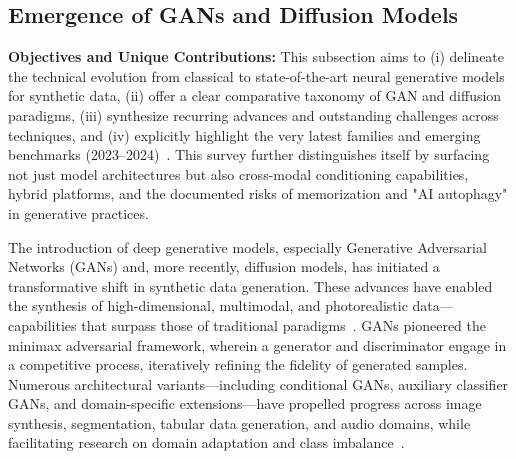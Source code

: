 \documentclass[sigconf]{acmart}
\begin{document}
\subsection{Emergence of GANs and Diffusion Models}

\textbf{Objectives and Unique Contributions:} This subsection aims to (i) delineate the technical evolution from classical to state-of-the-art neural generative models for synthetic data, (ii) offer a clear comparative taxonomy of GAN and diffusion paradigms, (iii) synthesize recurring advances and outstanding challenges across techniques, and (iv) explicitly highlight the very latest families and emerging benchmarks (2023--2024)~\cite{ref1,ref10,ref12,ref13,ref14,ref15,ref16,ref18,ref21,ref22,ref24,ref25,ref26,ref64,ref75,ref81,ref82,ref89,ref90}. This survey further distinguishes itself by surfacing not just model architectures but also cross-modal conditioning capabilities, hybrid platforms, and the documented risks of memorization and "AI autophagy" in generative practices.

The introduction of deep generative models, especially Generative Adversarial Networks (GANs) and, more recently, diffusion models, has initiated a transformative shift in synthetic data generation. These advances have enabled the synthesis of high-dimensional, multimodal, and photorealistic data---capabilities that surpass those of traditional paradigms~\cite{ref1,ref2,ref3,ref5,ref6,ref10,ref12,ref13,ref14,ref15,ref16,ref18,ref21,ref22,ref24,ref25,ref26,ref64,ref75,ref81,ref82,ref89,ref90}. GANs pioneered the minimax adversarial framework, wherein a generator and discriminator engage in a competitive process, iteratively refining the fidelity of generated samples. Numerous architectural variants---including conditional GANs, auxiliary classifier GANs, and domain-specific extensions---have propelled progress across image synthesis, segmentation, tabular data generation, and audio domains, while facilitating research on domain adaptation and class imbalance~\cite{ref10,ref12,ref13,ref14,ref26,ref75,ref81,ref90,ref89}.
\end{document}
